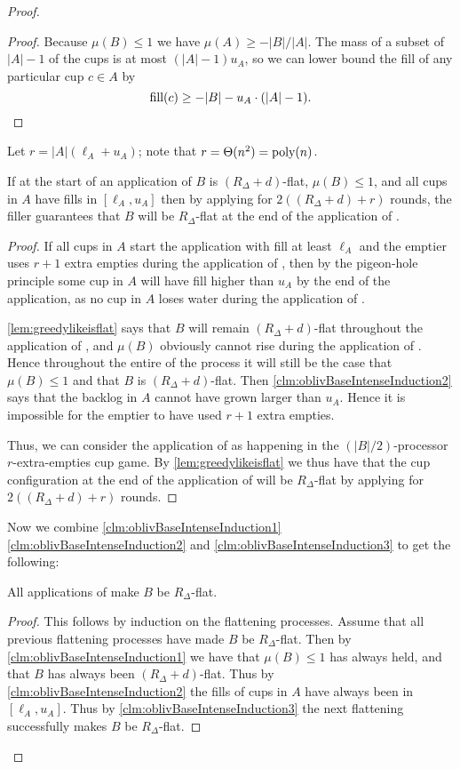 \begin{proof}
\begin{proof}
  Because $\mu(B) \le 1$ we have $\mu(A) \ge -|B|/|A|$. The mass
  of a subset of $|A|-1$ of the cups is at most $(|A|-1)u_A$, so
  we can lower bound the fill of any particular cup $c \in A$ by 
  $$\operatorname{\textnormal{fill}}(c) \ge -|B| -u_A \cdot (|A| -1).$$
\end{proof}

Let $r = |A|(\ell_A + u_A)$; note that $r = \Theta(n^2) =
\operatorname{\text{poly}}(n)$.
\begin{clm}
  \label{clm:oblivBaseIntenseInduction3}
  If at the start of an application of \flatalg $B$ is $(R_\Delta
  + d)$-flat, $\mu(B) \le 1$, and all cups in $A$ have fills in
  $[\ell_A, u_A]$ then by applying \flatalg for $2((R_\Delta + d)
  + r)$ rounds, the filler guarantees that $B$ will be
  $R_\Delta$-flat at the end of the application of \flatalg. 
\end{clm}
\begin{proof}
  If all cups in $A$ start the application with fill at
  least $\ell_A$ and the emptier uses $r+1$ extra
  empties during the application of \flatalg, then by the
  pigeon-hole principle some cup in $A$
  will have fill higher than $u_A$ by the end of the application,
  as no cup in $A$ loses water during the application of \flatalg.
  
  \cref{lem:greedylikeisflat} says that $B$ will remain
  $(R_\Delta + d)$-flat throughout the application of \flatalg,
  and $\mu(B)$ obviously cannot rise during the application of
  \flatalg. Hence throughout the entire of the process it will still be the
  case that $\mu(B) \le 1$ and that $B$ is $(R_\Delta + d)$-flat.
  Then \cref{clm:oblivBaseIntenseInduction2} says that the
  backlog in $A$ cannot have grown larger than $u_A$. Hence it is
  impossible for the emptier to have used $r+1$ extra empties.

  Thus, we can consider the application of \flatalg as happening
  in the $(|B|/2)$-processor $r$-extra-empties cup game. By
  \cref{lem:greedylikeisflat} we thus have that the cup
  configuration at the end of the application of \flatalg will be
  $R_\Delta$-flat by applying \flatalg for $2((R_\Delta + d) +
  r)$ rounds.
\end{proof}

Now we combine \cref{clm:oblivBaseIntenseInduction1}
\cref{clm:oblivBaseIntenseInduction2} and
\cref{clm:oblivBaseIntenseInduction3} to get the following:
\begin{clm}
  \label{clm:flatteningAlwaysWorks}
  All applications of \flatalg make $B$ be $R_\Delta$-flat.
 \end{clm}
\begin{proof}
  This follows by induction on the flattening processes. Assume
  that all previous flattening processes have made $B$ be
  $R_\Delta$-flat. Then by
  \cref{clm:oblivBaseIntenseInduction1} we have that $\mu(B) \le
  1$ has always held, and that $B$ has always been $(R_\Delta +
  d)$-flat. Thus by \cref{clm:oblivBaseIntenseInduction2} the
  fills of cups in $A$ have always been in $[\ell_A, u_A]$. Thus
  by \cref{clm:oblivBaseIntenseInduction3} the next flattening
  successfully makes $B$ be $R_\Delta$-flat.


\end{proof}
\end{proof}
